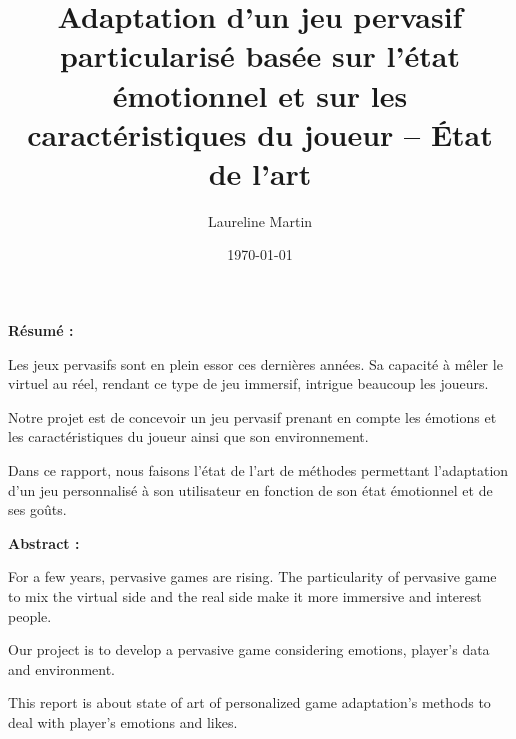 \documentclass{article}
\title{Adaptation d’un jeu pervasif particularisé basée sur l'état émotionnel et sur les caractéristiques du joueur – État de l’art}
\author{Laureline Martin}
\date{\today}
\begin{document}
\maketitle
\vspace*{8cm}
\begin{center}
    \textbf{Résumé :}
\end{center}
\hspace{0.4cm} 
Les jeux pervasifs sont en plein essor ces dernières années. 
Sa capacité à mêler le virtuel au réel, rendant ce type de jeu immersif, intrigue beaucoup les joueurs.\par
Notre projet est de concevoir un jeu pervasif prenant en compte les émotions et les caractéristiques du joueur ainsi que son environnement.\par
Dans ce rapport, nous faisons l'état de l'art de méthodes permettant l'adaptation d'un jeu personnalisé à son utilisateur en fonction de son état émotionnel et de ses goûts.
\bigskip
\begin{center}
    \textbf{Abstract :}
\end{center}
\hspace{0.4cm} 
For a few years, pervasive games are rising.
The particularity of pervasive game to mix the virtual side and the real side make it more immersive and interest people.\par
Our project is to develop a pervasive game considering emotions, player's data and environment.\par
This report is about state of art of personalized game adaptation's methods to deal with player's emotions and likes.
\end{document}
